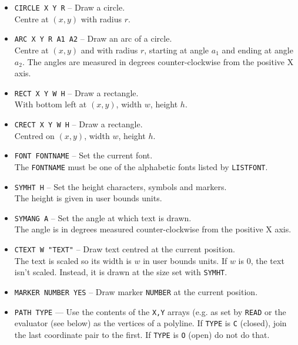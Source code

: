 \documentclass[a4paper,twoside,11pt]{article}
\newcommand{\textttc}[1]{\texttt{\textcolor{OurRed}{#1}}}
\begin{document}
\begin{itemize}
\item \textttc{CIRCLE X Y R} -- Draw a circle.\\
  Centre at $(x,y)$ with radius $r$.
\item \textttc{ARC X Y R A1 A2} -- Draw an arc of a circle.\\
  Centre at $(x,y)$ and with radius $r$, starting at angle
  $a_1$ and ending at angle $a_2$. The angles are measured in degrees counter-clockwise from the positive X axis.
\item \textttc{RECT X Y W H} -- Draw a rectangle.\\
  With bottom left at $(x,y)$, width $w$, height $h$.
\item \textttc{CRECT X Y W H} -- Draw a rectangle.\\
  Centred on  $(x,y)$, width $w$, height $h$.
\item \textttc{FONT FONTNAME} -- Set the current font.\\
  The \texttt{FONTNAME} must be one of the alphabetic fonts listed by \texttt{LISTFONT}.
\item \textttc{SYMHT H} -- Set the height characters, symbols and markers.\\
  The height is given in user bounds units.
\item \textttc{SYMANG A} -- Set the angle at which text is drawn.\\
  The angle is in degrees measured counter-clockwise from the positive X axis.
\item \textttc{CTEXT W "TEXT"} -- Draw text centred at the current position.\\
  The text is scaled so its width is $w$ in user bounds units. If $w$ is 0, the text isn't scaled.
  Instead, it is drawn at the size set with \texttt{SYMHT}.
\item \textttc{MARKER NUMBER YES} -- Draw marker \texttt{NUMBER} at the current position.
\item \textttc{PATH TYPE} --- Use the contents of the \texttt{X,Y} arrays (e.g. as set by \texttt{READ} or the
  evaluator (see below) as the vertices of a polyline. If \texttt{TYPE} is \texttt{C} (closed), join the
  last coordinate pair to the first. If \texttt{TYPE} is \texttt{O} (open) do not do that.
\end{itemize}
\end{document}
